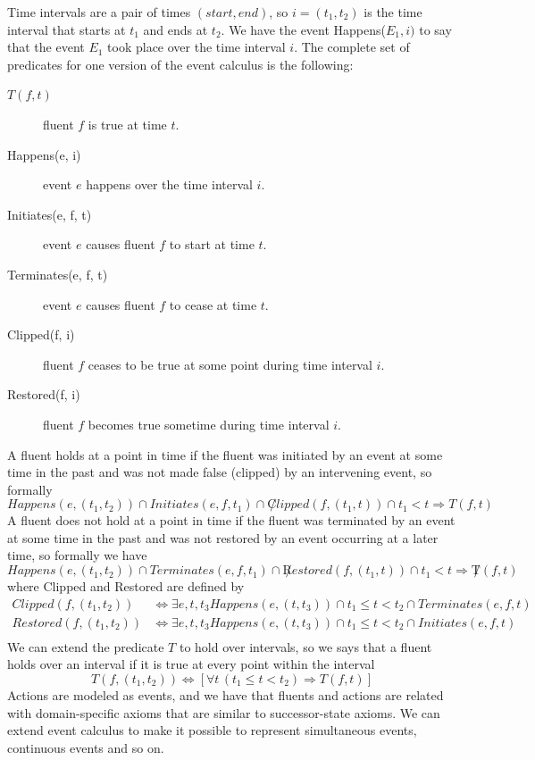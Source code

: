 Time intervals are a pair of times $(start, end)$, so $i = (t_1, t_2)$
is the time interval that starts at $t_1$ and ends at $t_2$.\newline
We have the event Happens($E_1, i)$ to say that the event $E_1$ took place 
over the time interval $i$.\newline
The complete set of predicates for one version of the event calculus is the following:
\begin{description}
    \item [$T(f, t)$] fluent $f$ is true at time $t$.
    \item [Happens(e, i)] event $e$ happens over the time interval $i$.
    \item [Initiates(e, f, t)] event $e$ causes fluent $f$ to start at time $t$.
    \item [Terminates(e, f, t)] event $e$ causes fluent $f$ to cease at time $t$.
    \item [Clipped(f, i)] fluent $f$ ceases to be true at some point during 
	                  time interval $i$.
    \item [Restored(f, i)] fluent $f$ becomes true sometime during time interval $i$.
\end{description}
A fluent holds at a point in time if the fluent was initiated by an event at some
time in the past and was not made false (clipped) by an intervening event, so formally
\[ Happens(e, (t_1, t_2)) \cap Initiates(e, f, t_1) \cap \not Clipped(f, (t_1, t)) \cap
   t_1 < t \Rightarrow T(f, t) \]
A fluent does not hold at a point in time if the fluent was terminated by an event
at some time in the past and was not restored by an event occurring at a later time,
so formally we have
\[ Happens(e, (t_1, t_2)) \cap Terminates(e, f, t_1) \cap \not Restored(f, (t_1, t)) \cap
   t_1 < t \Rightarrow \not T(f, t) \]
where Clipped and Restored are defined by
\begin{align*}
	Clipped(f , (t_1 , t_2)) & \iff \exists e, t, t_3 Happens(e, (t, t_3)) \cap
	t_1 \leq t < t_2 \cap Terminates(e, f, t) \\
        Restored(f, (t_1, t_2)) & \iff \exists e, t, t_3 Happens(e , (t, t_3)) \cap
	t_1 \leq t < t_2 \cap Initiates(e, f, t) \\
\end{align*}
We can extend the predicate $T$ to hold over intervals, so we says that a fluent
holds over an interval if it is true at every point within the interval
\[ T(f, (t_1, t_2)) \iff [\forall t \, (t_1 \leq t < t_2) \Rightarrow T(f, t)] \]
Actions are modeled as events, and we have that fluents and actions are related
with domain-specific axioms that are similar to successor-state axioms.\newline
We can extend event calculus to make it possible to represent simultaneous
events, continuous events and so on.

